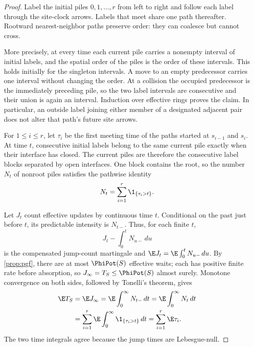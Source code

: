 \begin{proof}
Label the initial piles $0,1,\ldots,r$ from left to right and follow each
label through the site-clock arrows.  Labels that meet share one path
thereafter.  Rootward nearest-neighbor paths preserve order: they can
coalesce but cannot cross.

More precisely, at every time each current pile carries a nonempty interval
of initial labels, and the spatial order of the piles is the order of these
intervals.  This holds initially for the singleton intervals.  A move to an
empty predecessor carries one interval without changing the order.  At a
collision the occupied predecessor is the immediately preceding pile, so
the two label intervals are consecutive and their union is again an
interval.  Induction over effective rings proves the claim.  In particular,
an outside label joining either member of a designated adjacent pair does
not alter that path's future site arrows.

For $1\leq i\leq r$, let $\tau_i$ be the first meeting time of the paths
started at $s_{i-1}$ and $s_i$.  At time $t$, consecutive initial labels
belong to the same current pile exactly when their interface has closed.
The current piles are therefore the consecutive label blocks separated by
open interfaces.  One block contains the root, so the number $N_t$ of
nonroot piles satisfies the pathwise identity
\begin{equation}
 N_t=\sum_{i=1}^{r}\1_{\{\tau_i>t\}}.                  \label{eq:interfaces}
\end{equation}

Let $J_t$ count effective updates by continuous time $t$.  Conditional on
the past just before $t$, its predictable intensity is $N_{t-}$.  Thus, for
each finite $t$,
\[
 J_t-\int_0^tN_{u-}\,du
\]
is the compensated jump-count martingale and
$\E J_t=\E\int_0^tN_{u-}\,du$.  By \cref{prop:pgf}, there are at most
$\PhiPot(S)$ effective waits; each has positive finite rate before
absorption, so $J_\infty=T_S\leq\PhiPot(S)$ almost surely.  Monotone
convergence on both sides, followed by Tonelli's theorem, gives
\begin{align}
 \E T_S
 &=\E J_\infty
  =\E\int_0^\infty N_{t-}\,dt
  =\E\int_0^\infty N_t\,dt \notag\\
 &=\sum_{i=1}^{r}\E\int_0^\infty
       \1_{\{\tau_i>t\}}\,dt
  =\sum_{i=1}^{r}\E\tau_i.                             \label{eq:compensator}
\end{align}
The two time integrals agree because the jump times are Lebesgue-null.


\end{proof}
